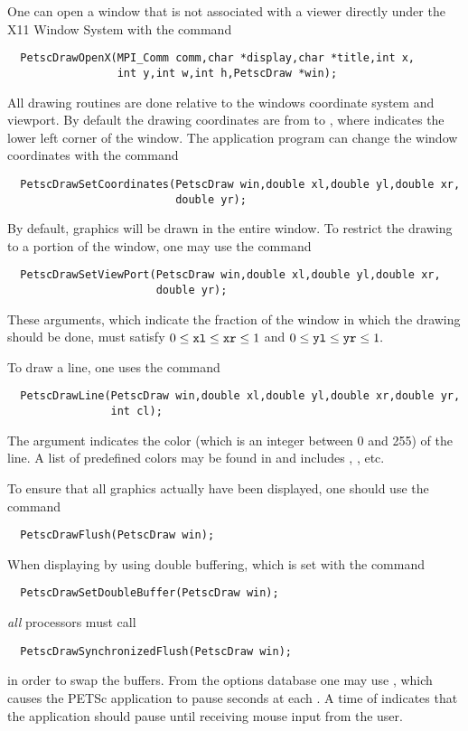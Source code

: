 One can open a window that is not associated with a viewer directly 
under the X11 Window System with the
command  
\begin{verbatim}
  PetscDrawOpenX(MPI_Comm comm,char *display,char *title,int x,
                 int y,int w,int h,PetscDraw *win);
\end{verbatim}
All drawing routines are done relative to the windows coordinate system 
and viewport. By default the drawing coordinates are from  to 
, where  indicates the lower left corner of the 
window. The application program can change the window coordinates with the 
command  
\begin{verbatim}
  PetscDrawSetCoordinates(PetscDraw win,double xl,double yl,double xr,
                          double yr);
\end{verbatim}
By default, graphics will be drawn in the entire window. To restrict the 
drawing to a portion of the window, one may 
use the command 
\begin{verbatim}
  PetscDrawSetViewPort(PetscDraw win,double xl,double yl,double xr,
                       double yr);
\end{verbatim}
These arguments, which indicate the fraction of the window in which the 
drawing should be done, must satisfy 
$ 0 \le {\tt xl} \le {\tt xr} \le 1 $ and $ 0 \le {\tt yl} \le {\tt yr} \le 1.$ 

To draw a line, one uses
 the command  
\begin{verbatim}
  PetscDrawLine(PetscDraw win,double xl,double yl,double xr,double yr,
                int cl);
\end{verbatim}
The argument  indicates the color (which is an integer between 0 and 255)
of the line. A list of predefined colors may be found in 
and includes , ,  etc.

To ensure that all graphics actually have been displayed, one should use 
 the
command 
\begin{verbatim}
  PetscDrawFlush(PetscDraw win);
\end{verbatim}
When displaying by using double buffering, which is set with the
command  
\begin{verbatim}
  PetscDrawSetDoubleBuffer(PetscDraw win);
\end{verbatim}
{\em all} processors must call 
\begin{verbatim}
  PetscDrawSynchronizedFlush(PetscDraw win);
\end{verbatim}
in order to swap the buffers. From the options database one may use 
, which  causes the PETSc application 
to pause  seconds at each . A time of 
indicates that the application should pause until receiving mouse 
input from the user.

